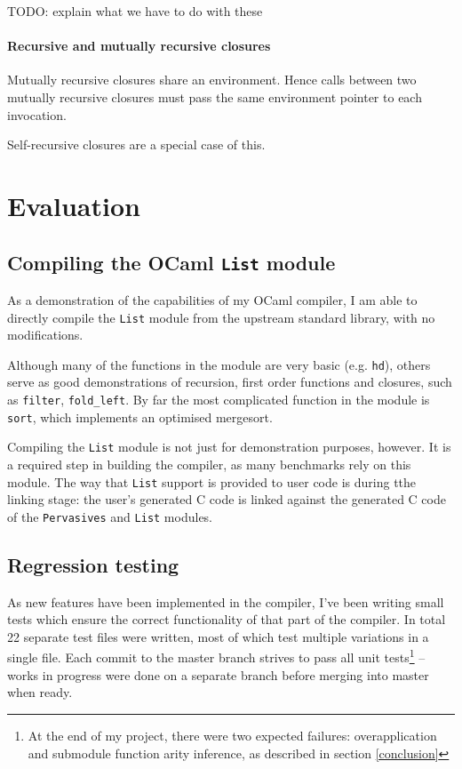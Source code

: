 \documentclass[12pt,a4paper,twoside,openright]{report}
\begin{document}
TODO: explain what we have to do with these

\subsubsection{Recursive and mutually recursive closures}

Mutually recursive closures share an environment. Hence calls between two
mutually recursive closures must pass the same environment pointer to each
invocation.

Self-recursive closures are a special case of this.



\chapter{Evaluation}

\section{Compiling the OCaml \texttt{List} module}\label{module-list}

As a demonstration of the capabilities of my OCaml compiler, I am able to
directly compile the \lstinline!List! module from the upstream standard
library, with no modifications.

Although many of the functions in the module are very basic (e.g.
\lstinline!hd!), others serve as good demonstrations of recursion, first order
functions and closures, such as \lstinline!filter!, \lstinline!fold_left!. By
far the most complicated function in the module is \lstinline!sort!, which
implements an optimised mergesort.

Compiling the \lstinline!List! module is not just for demonstration purposes,
however. It is a required step in building the compiler, as many benchmarks
rely on this module. The way that \lstinline!List! support is provided to user
code is during tthe linking stage: the user's generated C code is linked
against the generated C code of the \lstinline!Pervasives! and \lstinline!List!
modules.

\section{Regression testing}\label{regression-testing}

As new features have been implemented in the compiler, I've been writing small
tests which ensure the correct functionality of that part of the compiler. In
total 22 separate test files were written, most of which test multiple
variations in a single file. Each commit to the master branch strives to pass
all unit tests\footnote{At the end of my project, there were two expected
  failures: overapplication and submodule function arity inference, as
  described in section \ref{conclusion}}
-- works in progress were done on a separate branch before merging into master
when ready.
\end{document}
